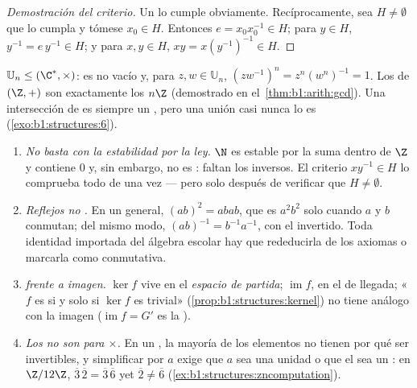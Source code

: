 \begin{proof}[Demostración del criterio]
Un  lo cumple obviamente. Recíprocamente, sea
$H \neq \emptyset$ que lo cumpla y tómese $x_0 \in H$. Entonces
$e = x_0 x_0^{-1} \in H$; para $y \in H$, $y^{-1} = e\,y^{-1} \in H$; y
para $x, y \in H$, $xy =
x (y^{-1})^{-1} \in H$.
\end{proof}

\begin{example}\label{ex:b1:structures:subgroups}
$\mathbb{U}_n \leq (\C^*, \times)$: es no vacío y, para $z, w \in
\mathbb{U}_n$, $(zw^{-1})^n = z^n (w^n)^{-1} = 1$. Los  de
$(\Z, +)$ son exactamente los $n\Z$ (demostrado en
el~\cref{thm:b1:arith:gcd}). Una intersección de  es siempre un
, pero una unión casi nunca lo es
(\cref{exo:b1:structures:6}).
\end{example}

\begin{remark}\label{rem:b1:structures:pitfalls}
\begin{enumerate}
  \item \emph{No basta con la estabilidad por la ley.} $\N$ es estable
        por la suma dentro de $\Z$ y contiene $0$ y, sin embargo, no es
        : faltan los inversos. El criterio $xy^{-1} \in H$ lo
        comprueba todo de una vez --- pero solo después de verificar
        que $H \neq \emptyset$.
  \item \emph{Reflejos no .} En un  general,
        $(ab)^2 = abab$, que es $a^2b^2$ solo cuando $a$ y $b$
        conmutan; del mismo modo, $(ab)^{-1} = b^{-1}a^{-1}$, con el
         invertido. Toda identidad importada del álgebra escolar
        hay que rededucirla de los axiomas o marcarla como conmutativa.
  \item \emph{ frente a imagen.} $\ker f$ vive en el
        \emph{espacio de partida}; $\operatorname{im} f$, en el de
        llegada; «$f$ es  si y solo si $\ker f$ es trivial»
        (\cref{prop:b1:structures:kernel}) no tiene análogo con la
        imagen ($\operatorname{im} f = G'$ es la ).
  \item \emph{Los  no son  para $\times$.} En un
        , la mayoría de los elementos no tienen por qué ser
        invertibles, y simplificar por $a$ exige que $a$ sea una unidad
        o que el  sea un : en $\Z/12\Z$,
        $\overline3\,\overline2 =
        \overline3\,\overline6$ yet $\overline2 \neq \overline6$
        (\cref{ex:b1:structures:zncomputation}).
\end{enumerate}
\end{remark}

